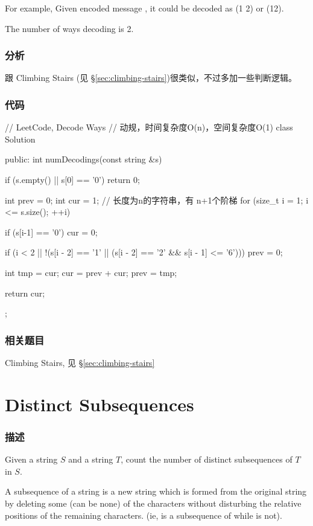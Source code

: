 For example,
Given encoded message , it could be decoded as  (1 2) or  (12).

The number of ways decoding  is 2.


\subsubsection{分析}
跟 Climbing Stairs (见 \S \ref{sec:climbing-stairs})很类似，不过多加一些判断逻辑。


\subsubsection{代码}
\begin{Code}
// LeetCode, Decode Ways
// 动规，时间复杂度O(n)，空间复杂度O(1)
class Solution {
public:
    int numDecodings(const string &s) {
        if (s.empty() || s[0] == '0') return 0;

        int prev = 0;
        int cur = 1;
        // 长度为n的字符串，有 n+1个阶梯
        for (size_t i = 1; i <= s.size(); ++i) {
            if (s[i-1] == '0') cur = 0;

            if (i < 2 || !(s[i - 2] == '1' ||
                     (s[i - 2] == '2' && s[i - 1] <= '6')))
                prev = 0;

            int tmp = cur;
            cur = prev + cur;
            prev = tmp;
        }
        return cur;
    }
};
\end{Code}


\subsubsection{相关题目}
\begindot
\item Climbing Stairs, 见 \S \ref{sec:climbing-stairs}
\myenddot


\section{Distinct Subsequences} %
\label{sec:distinct-subsequences}


\subsubsection{描述}
Given a string $S$ and a string $T$, count the number of distinct subsequences of $T$ in $S$.

A subsequence of a string is a new string which is formed from the original string by deleting some (can be none) of the characters without disturbing the relative positions of the remaining characters. (ie,  is a subsequence of  while  is not).

